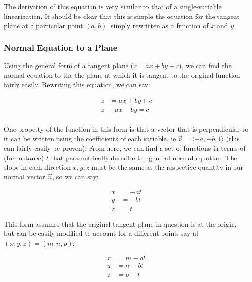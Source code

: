 \documentclass[12pt]{article}
\begin{document}
The derivation of this equation is very similar to that of a single-variable linearization. It should be clear that this is simple the equation for the tangent plane at a particular point $(a,b)$, simply rewritten as a function of $x$ and $y$.

\subsubsection{Normal Equation to a Plane}

Using the general form of a tangent plane ($z = ax + by + c$), we can find the normal equation to the the plane at which it is tangent to the original function fairly easily. Rewriting this equation, we can say:

\begin{equation}
    \begin{split}
        z &= ax + by + c\\
        z &- ax - by = c\\
    \end{split}
\end{equation}

One property of the function in this form is that a vector that is perpendicular to it can be written using the coefficients of each variable, ie $\vec{n} = \langle -a, -b,1 \rangle$ (this can fairly easily be proven). From here, we can find a set of functions in terms of (for instance) $t$ that parametrically describe the general normal equation. The slope in each direction $x, y,z$ must be the same as the respective quantity in our normal vector $\vec{n}$, so we can say:

\begin{equation}
    \begin{split}
        x &= -at\\
        y &= -bt\\
        z &= t
    \end{split}
\end{equation}

This form assumes that the original tangent plane in question is at the origin, but can be easily modified to account for a different point, say at $(x,y,z) = (m,n,p)$:

\begin{equation}
    \begin{split}
        x &=m-at\\
        y &= n-bt\\
        z &= p+t
    \end{split}
\end{equation}
\end{document}

